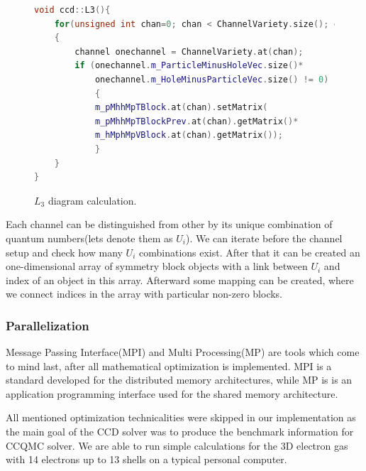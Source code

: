 \documentclass[twoside,english]{uiofysmaster}
\begin{document}
\begin{figure}
\begin{lstlisting}[language=C++]
void ccd::L3(){
	for(unsigned int chan=0; chan < ChannelVariety.size(); chan++)
	{
		channel onechannel = ChannelVariety.at(chan);
		if (onechannel.m_ParticleMinusHoleVec.size()*
			onechannel.m_HoleMinusParticleVec.size() != 0)
			{
			m_pMhhMpTBlock.at(chan).setMatrix(
			m_pMhhMpTBlockPrev.at(chan).getMatrix()*
			m_hMphMpVBlock.at(chan).getMatrix());
			}
	}
}
\end{lstlisting}
\caption{$L_3$ diagram calculation.}\label{fig:L3}
\end{figure}

Each channel can be distinguished from other by its unique combination of quantum numbers(lets denote them as $U_i$). We can iterate before the channel setup and check how many $U_i$ combinations exist. After that it can be created an one-dimensional array of symmetry block objects with a link between $U_i$ and index of an object in this array. Afterward some mapping can be created, where we connect indices in the array with particular non-zero blocks.

\subsubsection{Parallelization}

Message Passing Interface(MPI) and Multi Processing(MP) are tools which come to mind last, after all mathematical optimization is implemented. MPI is a standard developed for the distributed memory architectures, while MP is is an application programming interface used for the shared memory architecture.



All mentioned optimization technicalities were skipped in our implementation as the main goal of the CCD solver was to produce the benchmark information for CCQMC solver. We are able to run simple calculations for the 3D electron gas with 14 electrons up to 13 shells on a typical personal computer.
\end{document}
